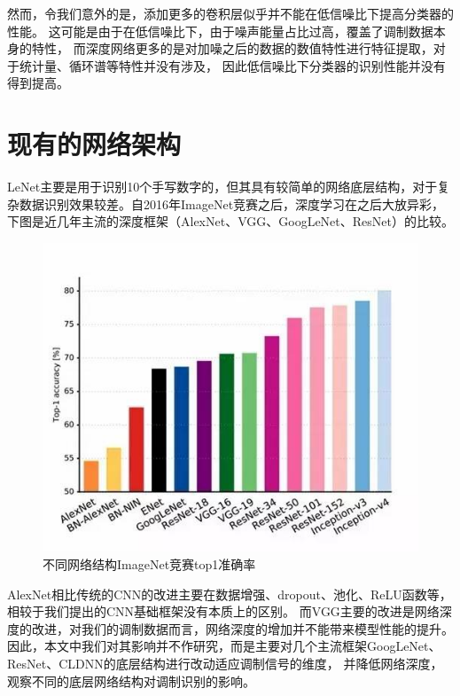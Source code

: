然而，令我们意外的是，添加更多的卷积层似乎并不能在低信噪比下提高分类器的性能。
这可能是由于在低信噪比下，由于噪声能量占比过高，覆盖了调制数据本身的特性，
而深度网络更多的是对加噪之后的数据的数值特性进行特征提取，对于统计量、循环谱等特性并没有涉及，
因此低信噪比下分类器的识别性能并没有得到提高。\par

\section{现有的网络架构}
LeNet主要是用于识别10个手写数字的，但其具有较简单的网络底层结构，对于复杂数据识别效果较差。自2016年ImageNet竞赛之后，深度学习在之后大放异彩，下图是近几年主流的深度框架（AlexNet、VGG、GoogLeNet、ResNet）的比较。\par
\begin{figure}[!h]
	\centering
	\includegraphics[scale=0.5]{figures/chapter_5/fig_5_4}
	\caption{不同网络结构ImageNet竞赛top1准确率}\label{sec:fig_5_4}
\end{figure}
AlexNet相比传统的CNN的改进主要在数据增强、dropout、池化、ReLU函数等，相较于我们提出的CNN基础框架没有本质上的区别。
而VGG主要的改进是网络深度的改进，对我们的调制数据而言，网络深度的增加并不能带来模型性能的提升。
因此，本文中我们对其影响并不作研究，而是主要对几个主流框架GoogLeNet、ResNet、CLDNN的底层结构进行改动适应调制信号的维度，
并降低网络深度，观察不同的底层网络结构对调制识别的影响。

